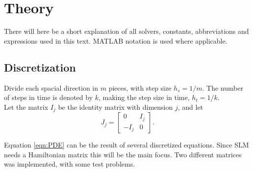 

\chapter{Theory}
There will here be a short explanation of all solvers, constants, abbreviations and expressions used in this text. MATLAB notation is used where applicable. 

\section{Discretization}%
Divide each spacial direction in $m$ pieces, with step size $h_s = 1/m$. The number of steps in time is denoted by $k$, making the step size in time, $h_t = 1/k$.\\

Let the matrix $I_j$ be the identity matrix with dimension $j$, and let 
\begin{equation}
J_j = 
\begin{bmatrix}
0&I_j\\-I_j&0
\end{bmatrix}.
\end{equation}

Equation \eqref{eqn:PDE} can be the result of several discretized equations. Since SLM needs a Hamiltonian matrix this will be the main focus. Two different matrices was implemented, with some test problems.\\

